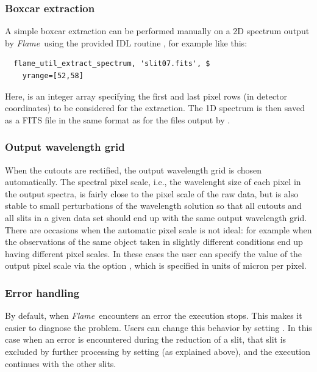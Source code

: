\documentclass[a4paper]{article}
\newcommand{\flame}{\emph{Flame}}
\begin{document}
\begin{sloppypar}
\subsubsection{Boxcar extraction}

A simple boxcar extraction can be performed manually on a 2D spectrum output by \flame\ using the provided IDL routine , for example like this:
\begin{lstlisting}
  flame_util_extract_spectrum, 'slit07.fits', $
    yrange=[52,58]
\end{lstlisting}
Here,  is an integer array specifying the first and last pixel rows (in detector coordinates) to be considered for the extraction. The 1D spectrum is then saved as a FITS file in the same format as for the files output by .


\subsubsection{Output wavelength grid}

When the cutouts are rectified, the output wavelength grid is chosen automatically. The spectral pixel scale, i.e., the wavelenght size of each pixel in the output spectra, is fairly close to the pixel scale of the raw data, but is also stable to small perturbations of the wavelength solution so that all cutouts and all slits in a given data set should end up with the same output wavelength grid. There are occasions when the automatic pixel scale is not ideal: for example when the observations of the same object taken in slightly different conditions end up having different pixel scales. In these cases the user can specify the value of the output pixel scale via the option , which is specified in units of micron per pixel.


\subsubsection{Error handling}

By default, when \flame\ encounters an error the execution stops. This makes it easier to diagnose the problem. Users can change this behavior by setting . In this case when an error is encountered during the reduction of a slit, that slit is excluded by further processing by setting  (as explained above), and the execution continues with the other slits.





\end{sloppypar}
\end{document}
